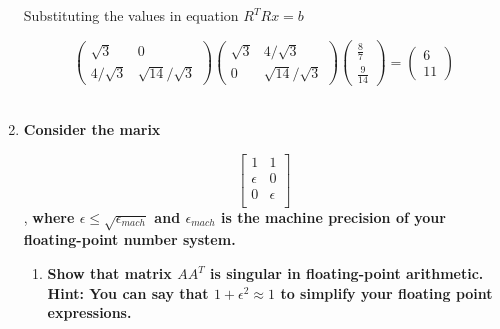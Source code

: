 \documentclass[12pt, oneside]{article}   	%
\begin{document}
\begin{enumerate}
	Substituting the values in equation $R^TRx=b$
	
	$$\left(\begin{array}{cc}\sqrt{3}&0\\4/ \sqrt{3}&\sqrt{14}/ \sqrt{3}\end{array}\right) \left(\begin{array}{cc}\sqrt{3}&4/ \sqrt{3}\\0&\sqrt{14}/ \sqrt{3}\end{array}\right)\left(\begin{array}{c}\frac{8}{7}\\\frac{9}{14}\end{array}\right) = \left(\begin{array}{c}6\\11\end{array}\right)$$\\
	
	
	\item \textbf{Consider the marix}
	
$$
\left [\begin{array}{cc} 1&1\\
\epsilon&0\\
0&\epsilon\\			
\end{array}\right]
$$,
\textbf{where $\epsilon \leq \sqrt{\epsilon_{mach}}$ and $\epsilon_{mach}$ is the machine precision of your floating-point number system.}
\begin{enumerate}
		\item \textbf{Show that matrix $AA^T$ is  singular in floating-point arithmetic.
		Hint: You can say that $1+\epsilon^2\approx 1$ to simplify your floating point expressions. }\\
		

\end{enumerate}
\end{enumerate}
\end{document}
